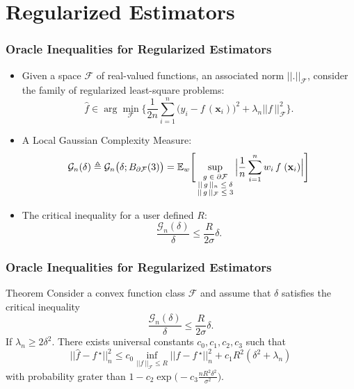 \documentclass[11pt]{beamer}
\newcommand{\E}{\mathbb{E}}
\newcommand{\bx}{\mathbf{x}}
\newcommand{\cF}{\mathcal{F}}
\newcommand{\cG}{\mathcal{G}}
\newcommand{\fstar}{f\,^\star}
\newcommand{\fhat}{\widehat{f}}
\begin{document}
	
	\section{Regularized Estimators}
	\frame{\sectionpage}
	
	\begin{frame}
		\frametitle{Oracle Inequalities for Regularized Estimators}
		\begin{itemize}
			\item Given a space $\cF$ of real-valued functions, an associated norm $||.||_\cF$, consider the family of regularized least-square problems:
			\begin{equation*}
				\fhat \in \arg\min_{\cF} \Big\{\frac{1}{2n} \sum_{i = 1}^{n} \big(y_i - f\,(\bx_i)\big)^2 + \lambda_n ||f\,||_\cF^2\Big\}.
			\end{equation*}
			\item A Local Gaussian Complexity Measure:
			\begin{equation*}
				\cG_n(\delta) \triangleq \cG_n\big(\delta; B_{\partial\cF}(3)\big) = \E_w\Bigg[\sup_{
					\begin{scriptsize}
					\begin{matrix}
					g\in \partial\cF\\||\,g\,||_n \leq \delta\\ ||\,g\,||_\cF \leq 3
					\end{matrix}
					\end{scriptsize}}\Big|\frac{1}{n}\sum_{i = 1}^{n}w_i\, f\;(\bx_i)\Big|\Bigg] 
			\end{equation*}
			\item The critical inequality for a user defined $R$:
			\begin{equation*}
				\frac{\cG_n(\delta)}{\delta}\leq \frac{R}{2\sigma}\delta.
			\end{equation*}
		\end{itemize}
	\end{frame}
	
	\begin{frame}
		\frametitle{Oracle Inequalities for Regularized Estimators}
		\begin{block}{Theorem}
			Consider a convex function class $\cF$ and assume that $\delta$ satisfies the critical inequality
			\begin{equation*}
			\frac{\cG_n(\delta)}{\delta}\leq \frac{R}{2\sigma}\delta.
			\end{equation*}
			 If $\lambda_n \geq 2\delta^2$. There exists universal constants $c_0, c_1, c_2, c_3$ such that 
			\begin{equation*}
			||\fhat - \fstar||_n^2 \leq c_0 \inf_{||f\,||_\cF \leq R} ||f - \fstar||_n^2 + c_1 R^2(\delta^2 +\lambda_n)
			\end{equation*}
			with probability grater than $1 - c_2 \exp\big(-c_3\frac{nR^2\delta^2}{\sigma^2}\big)$.
		\end{block}
	\end{frame}
\end{document}
